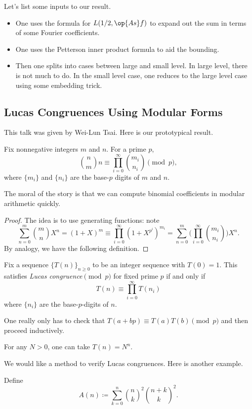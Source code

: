 \documentclass{article}
\begin{document}
Let's list some inputs to our result.
\begin{itemize}
	\item One uses the formula for $L(1/2,\op{As}f)$ to expand out the sum in terms of some Fourier coefficients.
	\item One uses the Petterson inner product formula to aid the bounding.
	\item Then one splits into cases between large and small level. In large level, there is not much to do. In the small level case, one reduces to the large level case using some embedding trick.
\end{itemize}

\subsection{Lucas Congruences Using Modular Forms}
This talk was given by Wei-Lun Tsai. Here is our prototypical result.
\begin{theorem}[Lucas]
	Fix nonnegative integers $m$ and $n$. For a prime $p$,
	\[\binom nmn\equiv\prod_{i=0}^\infty\binom{m_i}{n_i}\pmod p,\]
	where $\{m_i\}$ and $\{n_i\}$ are the base-$p$ digits of $m$ and $n$.
\end{theorem}
The moral of the story is that we can compute binomial coefficients in modular arithmetic quickly.
\begin{proof}
	The idea is to use generating functions: note
	\[\sum_{n=0}^m\binom mnX^n=(1+X)^m\equiv\prod_{i=0}^\infty\left(1+X^{p^i}\right)^{m_i}=\sum_{n=0}^m\Bigg(\prod_{i=0}^\infty\binom{m_i}{n_i}\Bigg)X^n.\]
	By analogy, we have the following definition.
\end{proof}
\begin{definition}
	Fix a sequence $\{T(n)\}_{n\ge0}$ to be an integer sequence with $T(0)=1$. This satisfies \textit{Lucas congruence$\pmod p$} for fixed prime $p$ if and only if
	\[T(n)\equiv\prod_{i=0}^\infty T(n_i)\]
	where $\{n_i\}$ are the base-$p$-digits of $n$.
\end{definition}
\begin{remark}
	One really only has to check that $T(a+bp)\equiv T(a)T(b)\pmod p$ and then proceed inductively.
\end{remark}
\begin{example}
	For any $N>0$, one can take $T(n)=N^n$.
\end{example}
We would like a method to verify Lucas congruences. Here is another example.
\begin{definition}[Ap\'ery]
	Define
	\[A(n)\coloneqq\sum_{k=0}^n\binom nk^2\binom{n+k}k^2.\]
\end{definition}
\end{document}
